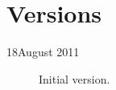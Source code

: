 \section*{Versions}


\begin{description}
\item[18\supernd August 2011] Initial version.
\end{description}